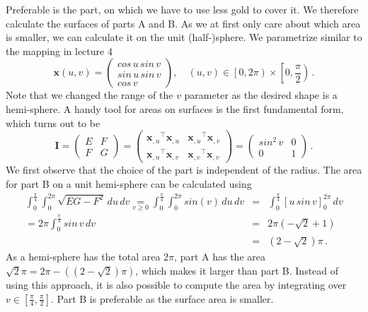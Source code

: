 \documentclass{scrartcl}
\begin{document}
Preferable is the part, on which we have to use less gold to cover it.
We therefore calculate the surfaces of parts A and B.
As we at first only care about which area is smaller, we can calculate it on the 
unit (half-)sphere.
We parametrize similar to the mapping in lecture 4
\begin{equation}
	\mathbf{x}(u,v) = 
	\begin{pmatrix}
		cos\,u\,sin\,v\\
		sin\,u\,sin\,v\\
		cos\,v
	\end{pmatrix}
	,\quad
	\left(u,v\right)\in \left[0,2\pi\right)\times \left[0,\frac{\pi}{2}\right) \, .
\end{equation}
Note that we changed the range of the $v$ parameter as the desired shape is a hemi-sphere.
A handy tool for areas on surfaces is the first fundamental form, which turns out to be
\begin{equation}
	\mathbf{I} =
	\begin{pmatrix}
		E & F\\
		F & G
	\end{pmatrix}
	=
	\begin{pmatrix}
		{\mathbf{x}_{,u}}^\top{\mathbf{x}_{,u}} & {\mathbf{x}_{,u}}^\top{\mathbf{x}_{,v}}\\
		{\mathbf{x}_{,u}}^\top{\mathbf{x}_{,v}} & {\mathbf{x}_{,v}}^\top{\mathbf{x}_{,v}}
	\end{pmatrix}
	=
	\begin{pmatrix}
		sin^2\,v & 0\\
		0 & 1
	\end{pmatrix}\, .
\end{equation}
We first observe that the choice of the part is independent of the radius. The area for part B on a unit hemi-sphere can be calculated using
\begin{eqnarray}
	\int_0^{\frac{\pi}{4}}\int_0^{2\pi} \sqrt{EG-F^2} \, du \, dv
	\underset{v \ge 0}{=}\int_0^{\frac{\pi}{4}}\int_0^{2\pi} sin(v) \, du \, dv
	&=&\int_0^{\frac{\pi}{4}}[u\,sin\,v]_0^{2\pi} \, dv \\\nonumber
	=2\pi\int_0^{\frac{\pi}{4}}sin\,v\,dv
	&=&2\pi(-\sqrt{2}+1)\\\nonumber
	&=&(2-\sqrt{2})\pi\, .
\end{eqnarray}
As a hemi-sphere has the total area $2\pi$, part A has the area
$\sqrt{2}\pi=2\pi-((2-\sqrt{2})\pi)$, which makes it larger than part B.
Instead of using this approach, it is also possible to compute the area by integrating over $v \in \left[\frac{\pi}{4}, \frac{\pi}{2}\right]$.
Part B is preferable as the surface area is smaller.
\end{document}
